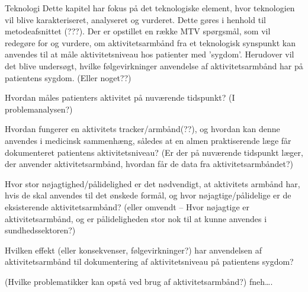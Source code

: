 Teknologi
Dette kapitel har fokus på det teknologiske element, hvor teknologien vil blive karakteriseret, analyseret og vurderet. Dette gøres i henhold til metodeafsnittet (???). Der er opstillet en række MTV spørgsmål, som vil redegøre for og vurdere, om aktivitetsarmbånd fra et teknologisk synspunkt kan anvendes til at måle aktivitetsniveau hos patienter med ’sygdom’. Herudover vil det blive undersøgt, hvilke følgevirkninger anvendelse af aktivitetsarmbånd har på patientens sygdom. (Eller noget??)

Hvordan måles patienters aktivitet på nuværende tidspunkt? (I problemanalysen?)

Hvordan fungerer en aktivitets tracker/armbånd(??), og hvordan kan denne anvendes i medicinsk sammenhæng, således at en almen praktiserende læge får dokumenteret patientens aktivitetsniveau?
(Er der på nuværende tidspunkt læger, der anvender aktivitetsarmbånd, hvordan får de data fra aktivitetsarmbåndet?)

Hvor stor nøjagtighed/pålidelighed er det nødvendigt, at aktivitets armbånd har, hvis de skal anvendes til det ønskede formål, og hvor nøjagtige/pålidelige er de eksisterende aktivitetsarmbånd? (eller omvendt – Hvor nøjagtige er aktivitetsarmbånd, og er pålideligheden stor nok til at kunne anvendes i sundhedssektoren?)

Hvilken effekt (eller konsekvenser, følgevirkninger?) har anvendelsen af aktivitetsarmbånd til dokumentering af aktivitetsniveau på patientens sygdom?

(Hvilke problematikker kan opstå ved brug af aktivitetsarmbånd?) fneh….